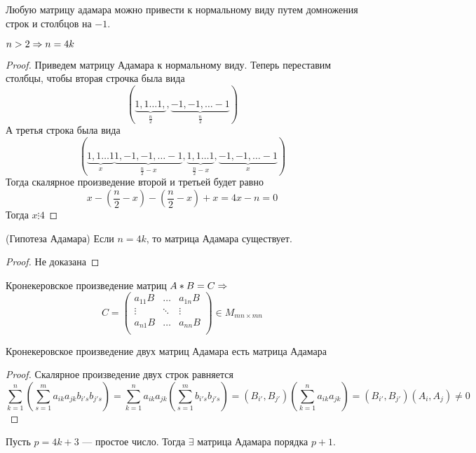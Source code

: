 \begin{note}
    Любую матрицу адамара можно привести к нормальному виду путем домножения строк и столбцов на \(-1\).
\end{note}
\begin{theorem}
    \(n > 2 \Rightarrow n = 4k\)
\end{theorem}
\begin{proof}
    Приведем матрицу Адамара к нормальному виду. Теперь переставим столбцы, чтобы вторая строчка была вида
    \[(\underbrace{1, 1 \dots 1,}_{\frac{n}{2}}, \underbrace{-1, -1, \dots -1}_{\frac{n}{2}} )\]
    А третья строка была вида
    \[(\underbrace{1, 1 \dots 1}_{x}  \underbrace{1, -1, -1, \dots -1}_{\frac{n}{2} - x}, \underbrace{1, 1 \dots 1}_{\frac{n}{2} - x},  \underbrace{-1, -1, \dots -1}_{x} )\]
    Тогда скалярное произведение второй и третьей будет равно 
    \[x - \left(\frac{n}{2} - x\right) - \left(\frac{n}{2} - x\right) + x = 4x - n = 0\]
    Тогда \(x \vdots 4\)
\end{proof}
\begin{theorem}(Гипотеза Адамара)
    Если \(n = 4k\), то матрица Адамара существует.
\end{theorem}
\begin{proof}
    Не доказана
\end{proof}
\begin{definition}
    Кронекеровское произведение матриц \(A * B = C \Rightarrow\)
    \[C = \left(\begin{array}{ccc}
        a_{11}B & \dots & a_{1n}B \\ 
        \vdots & \ddots & \vdots \\ 
        a_{n1}B & \dots & a_{nn}B \\ 
    \end{array}\right) \in M_{mn \times mn}\]
\end{definition}
\begin{proposition}
    Кронекеровское произведение двух матриц Адамара есть матрица Адамара
\end{proposition}
\begin{proof}
    Скалярное произведение двух строк равняется 
    \[\sum_{k = 1}^n\left(\sum_{s = 1}^m a_{ik}a_{jk}b_{i's}b_{j's}\right) = \sum_{k = 1}^na_{ik}a_{jk}\left(\sum_{s = 1}^mb_{i's}b_{j's}\right) = (B_{i'}, B_{j'})\left(\sum_{k = 1}^na_{ik}a_{jk}\right) = (B_{i'}, B_{j'})(A_i, A_j) \ne 0\]
\end{proof}
\begin{theorem}[Пэли]
    Пусть \(p = 4k + 3\) --- простое число. Тогда \(\exists \) матрица Адамара порядка \(p + 1\).
\end{theorem}
